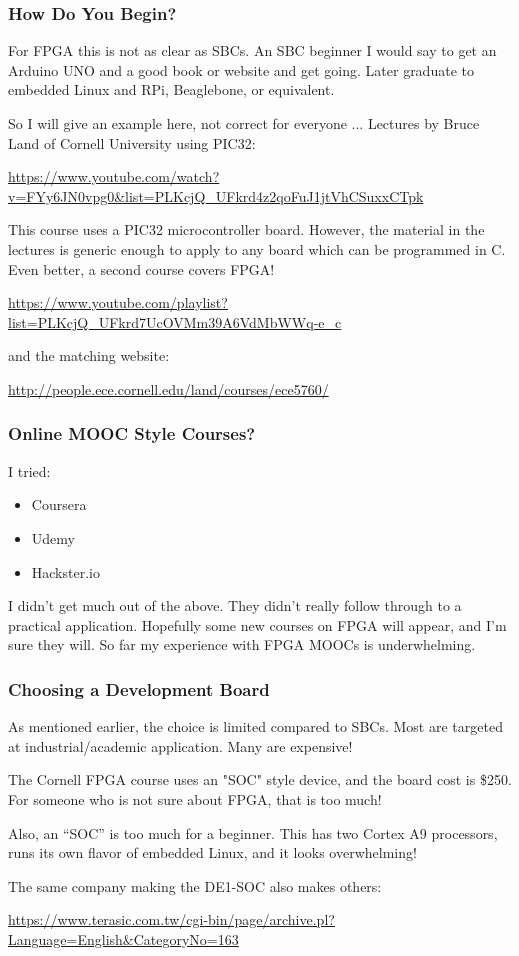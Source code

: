 \documentclass{beamer}
\begin{document}
\begin{frame}
\frametitle{How Do You Begin?}

For FPGA this is not as clear as SBCs.  An SBC beginner I would say to get an Arduino UNO and a good book or website and get going.  Later graduate to embedded Linux and RPi, Beaglebone, or equivalent.

So I will give an example here, not correct for everyone ...
Lectures by Bruce Land of Cornell University using PIC32:

\begin{tiny}
\url{https://www.youtube.com/watch?v=FYy6JN0vpg0&list=PLKcjQ_UFkrd4z2qoFuJ1jtVhCSuxxCTpk}
\end{tiny}

This course uses a PIC32 microcontroller board.  However, the material in the lectures is generic enough to apply to any board which can be programmed in C.
Even better, a second course covers FPGA!

\begin{scriptsize}
\url{https://www.youtube.com/playlist?list=PLKcjQ_UFkrd7UcOVMm39A6VdMbWWq-e_c}
\end{scriptsize}

and the matching website:

\url{http://people.ece.cornell.edu/land/courses/ece5760/}

\end{frame}

\begin{frame}
\frametitle{Online MOOC Style Courses?}

I tried:

\begin{itemize}
	\item Coursera
\item Udemy
\item Hackster.io
\end{itemize}

I didn't get much out of the above.  They didn't really follow through to a practical application.  Hopefully some new courses on FPGA will appear, and I'm sure they will.
So far my experience with FPGA MOOCs is underwhelming.

\end{frame}

\begin{frame}
\frametitle{Choosing a Development Board}

As mentioned earlier, the choice is limited compared to SBCs.  Most are targeted at  industrial/academic application.  Many are expensive!

The Cornell FPGA course uses an "SOC" style device, and the board cost is \$250.
For someone who is not sure about FPGA, that is too much!

Also, an ``SOC'' is too much for a beginner.  This has two Cortex A9 processors, runs its own flavor of embedded Linux, and it looks overwhelming!

The same company making the DE1-SOC also makes others:

{\tiny \url{https://www.terasic.com.tw/cgi-bin/page/archive.pl?Language=English&CategoryNo=163}}

\end{frame}
\end{document}
